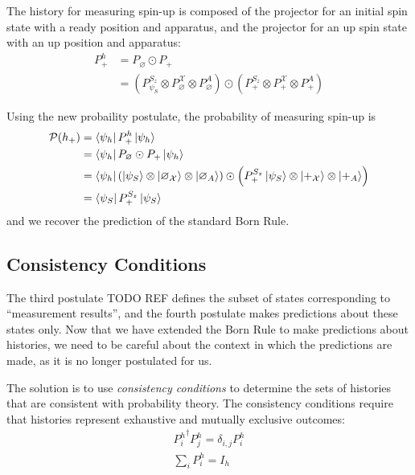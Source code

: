 The history for measuring spin-up is composed of the projector for an initial spin state with a ready position and apparatus, and the projector for an up spin state with an up position and apparatus:
\begin{align}
  P^h_+ &= P_\varnothing \odot P_+ \\ \nonumber
  &= \left(P^{S_z}_{\psi_S} \otimes P^\mathcal{X}_\varnothing \otimes P^A_\varnothing \right) \odot \left(P^{S_z}_+ \otimes P^\mathcal{X}_+ \otimes P^A_+ \right)
\end{align}

Using the new probaility postulate, the probability of measuring spin-up is
\begin{align}
    \mathcal{P}(h_+) &= \bra{\psi_h} P^h_+ \ket{\psi_h} \\ \nonumber
    &= \bra{\psi_h} P_\varnothing \odot P_+ \ket{\psi_h} \\ \nonumber
    &=  \bra{\psi_h}  \left(\ket{\psi_S} \otimes \ket{\varnothing_\mathcal{X}} \otimes \ket{\varnothing_A} \right)\odot \left(P^{S_z}_+\ket{\psi_S} \otimes \ket{+_\mathcal{X}} \otimes \ket{+_A} \right) \\ \nonumber
    &= \bra{\psi_S} P^{S_z}_+ \ket{\psi_S}
\end{align}
and we recover the prediction of the standard Born Rule.

\subsection{Consistency Conditions}

The third postulate TODO REF defines the subset of states corresponding to ``measurement results'', and the fourth postulate makes predictions about these states only. Now that we have extended the Born Rule to make predictions about histories, we need to be careful about the context in which the predictions are made, as it is no longer postulated for us.



The solution is to use \textit{consistency conditions} to determine the sets of histories that are consistent with probability theory. The consistency conditions require that histories represent exhaustive and mutually exclusive outcomes:
\begin{align}
  {P^h_i}^\dagger P^h_j = \delta_{i,j} P^h_i \\
  \sum_i P^h_i = I_h
\end{align}

